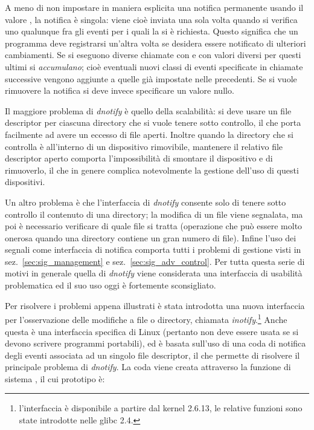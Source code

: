 A meno di non impostare in maniera esplicita una notifica permanente usando il
valore , la notifica è singola: viene cioè inviata una
sola volta quando si verifica uno qualunque fra gli eventi per i quali la si è
richiesta. Questo significa che un programma deve registrarsi un'altra volta
se desidera essere notificato di ulteriori cambiamenti. Se si eseguono diverse
chiamate con  e con valori diversi per  questi
ultimi si \textsl{accumulano}; cioè eventuali nuovi classi di eventi
specificate in chiamate successive vengono aggiunte a quelle già impostate
nelle precedenti.  Se si vuole rimuovere la notifica si deve invece
specificare un valore nullo.


Il maggiore problema di \textit{dnotify} è quello della scalabilità: si deve
usare un file descriptor per ciascuna directory che si vuole tenere sotto
controllo, il che porta facilmente ad avere un eccesso di file aperti. Inoltre
quando la directory che si controlla è all'interno di un dispositivo
rimovibile, mantenere il relativo file descriptor aperto comporta
l'impossibilità di smontare il dispositivo e di rimuoverlo, il che in genere
complica notevolmente la gestione dell'uso di questi dispositivi.

Un altro problema è che l'interfaccia di \textit{dnotify} consente solo di
tenere sotto controllo il contenuto di una directory; la modifica di un file
viene segnalata, ma poi è necessario verificare di quale file si tratta
(operazione che può essere molto onerosa quando una directory contiene un gran
numero di file).  Infine l'uso dei segnali come interfaccia di notifica
comporta tutti i problemi di gestione visti in sez.~\ref{sec:sig_management} e
sez.~\ref{sec:sig_adv_control}.  Per tutta questa serie di motivi in generale
quella di \textit{dnotify} viene considerata una interfaccia di usabilità
problematica ed il suo uso oggi è fortemente sconsigliato.


Per risolvere i problemi appena illustrati è stata introdotta una nuova
interfaccia per l'osservazione delle modifiche a file o directory, chiamata
\textit{inotify}.\footnote{l'interfaccia è disponibile a partire dal kernel
  2.6.13, le relative funzioni sono state introdotte nelle glibc 2.4.}  Anche
questa è una interfaccia specifica di Linux (pertanto non deve essere usata se
si devono scrivere programmi portabili), ed è basata sull'uso di una coda di
notifica degli eventi associata ad un singolo file descriptor, il che permette
di risolvere il principale problema di \textit{dnotify}.  La coda viene creata
attraverso la funzione di sistema , il cui prototipo è:

